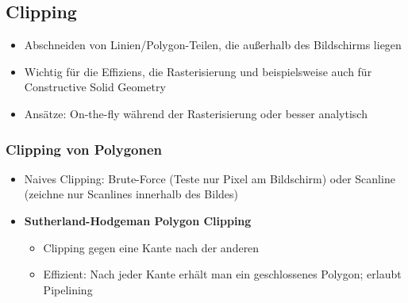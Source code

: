 \subsection{Clipping}
\begin{itemize}
	\item Abschneiden von Linien/Polygon-Teilen, die außerhalb des Bildschirms liegen
	\item Wichtig für die Effiziens, die Rasterisierung und beispielsweise auch für Constructive Solid Geometry
	\item Ansätze: On-the-fly während der Rasterisierung oder besser analytisch
\end{itemize}

\subsubsection{Clipping von Polygonen}
\begin{itemize}
	\item Naives Clipping: Brute-Force (Teste nur Pixel am Bildschirm) oder Scanline (zeichne nur Scanlines innerhalb des Bildes)
	\item \textbf{Sutherland-Hodgeman Polygon Clipping}
	\begin{itemize}
		\item Clipping gegen eine Kante nach der anderen
		\item Effizient: Nach jeder Kante erhält man ein geschlossenes Polygon; erlaubt Pipelining
	\end{itemize}
\end{itemize}


